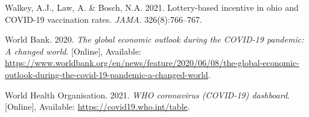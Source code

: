 \documentclass[11pt,preprint, authoryear]{elsarticle}
\numberwithin{equation}{section}
\numberwithin{figure}{section}
\numberwithin{table}{section}
\newlength{\cslhangindent}
\newenvironment{CSLReferences}%
  {\setlength{\parindent}{0pt}%
  \everypar{\setlength{\hangindent}{\cslhangindent}}\ignorespaces}%
  {\par}
\begin{document}
\begin{CSLReferences}{1}{0}
\leavevmode\hypertarget{ref-ohio}{}%
Walkey, A.J., Law, A. \& Bosch, N.A. 2021. Lottery-based incentive in
ohio and COVID-19 vaccination rates. \emph{JAMA}. 326(8):766--767.

\leavevmode\hypertarget{ref-bank}{}%
World Bank. 2020. \emph{The global economic outlook during the COVID-19
pandemic: A changed world}. {[}Online{]}, Available:
\url{https://www.worldbank.org/en/news/feature/2020/06/08/the-global-economic-outlook-during-the-covid-19-pandemic-a-changed-world}.

\leavevmode\hypertarget{ref-who}{}%
World Health Organisation. 2021. \emph{WHO coronavirus (COVID-19)
dashboard}. {[}Online{]}, Available:
\url{https://covid19.who.int/table}.

\end{CSLReferences}


\end{document}
